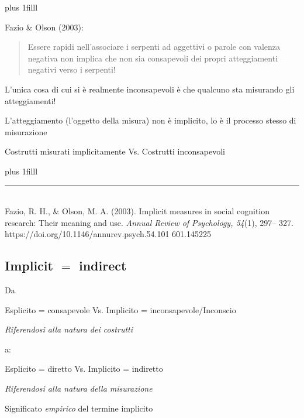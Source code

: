 \documentclass[compress]{beamer}
\begin{document}
\begin{frame}
	\vskip0pt plus 1filll
	
	Fazio \& Olson (2003):
	
	\vspace{3mm}
	
	\begin{quote}
		Essere rapidi nell'associare i serpenti ad aggettivi o parole con valenza negativa non implica che non sia consapevoli dei propri atteggiamenti negativi verso i serpenti!
	\end{quote}

	\vspace{1.45mm}
	
	L'unica cosa di cui si è realmente inconsapevoli è che qualcuno sta misurando gli atteggiamenti!
	
	L'atteggiamento (l'oggetto della misura) non è implicito, lo è il processo stesso di misurazione


	\vspace{1.5mm}
	Costrutti misurati implicitamente Vs. Costrutti inconsapevoli 

\vskip0pt plus 1filll

\color{template}\rule{0.30\linewidth}{0.5pt}\\
\color{black}
\scriptsize{Fazio, R. H., \& Olson, M. A. (2003). Implicit measures in social cognition research: Their meaning
	and use. \emph{Annual Review of Psychology, 54}(1), 297–
	327. https://doi.org/10.1146/annurev.psych.54.101
	601.145225}

\end{frame}

\subsection*{Implicit $=$ indirect}


\begin{frame}
	
	\begin{center}
		Da
		
		\vspace{3.5mm}
		Esplicito = consapevole Vs. Implicito = inconsapevole/Inconscio  
		
		\emph{Riferendosi alla natura dei costrutti}
		\vspace{3.5mm}
		
		a:
		
		\vspace{3.5mm}
		Esplicito = diretto Vs. Implicito = indiretto 
		
		\emph{Riferendosi alla natura della misurazione}
	\end{center}
	
	\vspace{3.5mm}
	Significato \emph{empirico} del termine implicito
\end{frame}
\end{document}
